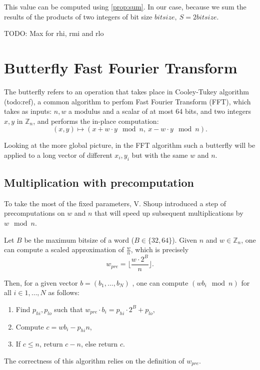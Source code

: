\documentclass[a4paper]{article}
\begin{document}
This value can be computed using \ref{prop:sum}. In our case, because we sum the results of the products of two integers of bit size $bitsize,\ S = 2 bitsize$.

TODO: Max for rhi, rmi and rlo



\section{Butterfly Fast Fourier Transform}

The butterfly refers to an operation that takes place in Cooley-Tukey algorithm (todo:ref), a common algorithm to perfom 
Fast Fourier Transform (FFT), which takes as inputs: $n, w$ a modulus and a scalar of at most 64 bits, and two integers 
$x, y$ in $\mathbb{Z}_n$, and performs the in-place computation:
\[
(x,y) \mapsto (x + w\cdot y \mod n,\ x - w\cdot y \mod n).
\]

Looking at the more global picture, in the FFT algorithm such a butterfly will
be applied to a long vector of different \(x_i, y_i\) but with the same \(w\) and \(n\).


\subsection{Multiplication with precomputation}

To take the most of the fixed parameters, V. Shoup\cite{Bos_Stam_2021} introduced a step of precomputations on $w$ and $n$ that will speed up subsequent multiplications by $w \mod n$.

Let $B$ be the maximum bitsize of a word ($B\in \{32, 64\}$). Given $n$ and $w \in \mathbb{Z}_n$, one can compute a scaled approximation 
of $\frac{w}{n}$, which is precisely $$ w_{pre} = \biggl\lfloor\dfrac{w\cdot 2^{B}}{n} \biggr\rfloor.$$

Then, for a given vector $b = (b_1,\dots, b_N)$ , one can compute $(wb_i \mod n)$ for all $i\in{1,\dots, N}$ as follows:

\begin{enumerate}
    \item Find $p_{hi}, p_{lo}$ such that $w_{pre} \cdot b_i = p_{hi}\cdot 2^B + p_{lo}$,
    \item Compute $c = wb_i - p_{hi}n$,
    \item If $c \leq n$, return $c-n$, else return $c$.
\end{enumerate}

The correctness of this algorithm relies on the definition of $w_{pre}$. 
\end{document}
